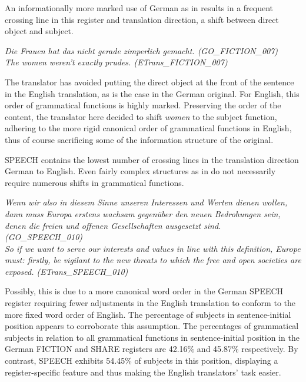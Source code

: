 \documentclass[output=paper]{LSP/langsci}
\begin{document}
An informationally more marked use of German as in  results in a frequent crossing line in this register and translation direction, a shift between direct object and subject. 


\ea \label{ex:culo:25}
  \ea 
\textit{Die Frauen hat das nicht gerade zimperlich gemacht. \textup{(GO\_FICTION\_007)}}\\
   \ex \textit{The women weren't exactly prudes. \textup{(ETrans\_FICTION\_007)}}
   \z
\z

The translator has avoided putting the direct object at the front of the sentence in the English translation, as is the case in the German original. For English, this order of grammatical functions is highly marked. Preserving the order of the content, the translator here decided to shift \textit{women} to the subject function, adhering to the more rigid canonical order of grammatical functions in English, thus of course sacrificing some of the information structure of the original.

SPEECH contains the lowest number of crossing lines in the translation direction German to English. Even fairly complex structures as in  do not necessarily require numerous shifts in grammatical functions.


\ea \label{ex:culo:26}
   \ea
\textit{Wenn wir also in diesem Sinne unseren Interessen und Werten dienen wollen, dann   muss Europa erstens wachsam gegenüber den neuen Bedrohungen sein, denen die   freien und offenen Gesellschaften ausgesetzt sind. \textup{(GO\_SPEECH\_010)}}\\
   \ex 
   \textit{So if we want to serve our interests and values in line with this definition, Europe must:   firstly, be vigilant to the new threats to which the free and open societies are exposed.   \textup{(ETrans\_SPEECH\_010)}}
   \z
\z

Possibly, this is due to a more canonical word order in the German SPEECH register requiring fewer adjustments in the English translation to conform to the more fixed word order of English. The percentage of subjects in sentence-initial position appears to corroborate this assumption. The percentages of grammatical subjects in relation to all grammatical functions in sentence-initial position in the German FICTION and SHARE registers are 42.16\% and 45.87\% respectively. By contrast, SPEECH exhibits 54.45\% of subjects in this position, displaying a register-specific feature and thus making the English translators' task easier.
\end{document}

